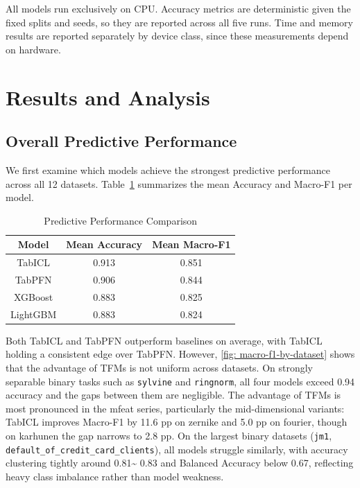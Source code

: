 \documentclass{SYSUReport}
\begin{document}
All models run exclusively on CPU. Accuracy metrics are deterministic given the fixed splits and seeds, so they are reported across all five runs. Time and memory results are reported separately by device class, since these measurements depend on hardware.








\section{Results and Analysis}
\subsection{Overall Predictive Performance}

We first examine which models achieve the strongest predictive performance across all 12 datasets. Table~\ref{tab: predictive_performance} summarizes the mean Accuracy and Macro-F1 per model.


\begin{table}[htbp]
    \centering
    \caption{Predictive Performance Comparison}
    \label{tab: predictive_performance}
    \begin{tabular}{ccc}
    \hline
        Model & Mean Accuracy & Mean Macro-F1 \\
    \hline
        TabICL & 0.913 & 0.851 \\
        TabPFN & 0.906 & 0.844 \\
        XGBoost & 0.883 & 0.825 \\
        LightGBM & 0.883 & 0.824 \\
    \hline
    \end{tabular}
\end{table}

Both TabICL and TabPFN outperform baselines on average, with TabICL holding a consistent edge over TabPFN. However, \autoref{fig: macro-f1-by-dataset} shows that the advantage of TFMs is not uniform across datasets. On strongly separable binary tasks such as \texttt{sylvine} and \texttt{ringnorm}, all four models exceed 0.94 accuracy and the gaps between them are negligible. The advantage of TFMs is most pronounced in the mfeat series, particularly the mid-dimensional variants: TabICL improves Macro-F1 by 11.6 pp on zernike and 5.0 pp on fourier, though on karhunen the gap narrows to 2.8 pp. On the largest binary datasets (\texttt{jm1}, \texttt{default\_of\_credit\_card\_clients}), all models struggle similarly, with accuracy clustering tightly around 0.81\textasciitilde{} 0.83 and Balanced Accuracy below 0.67, reflecting heavy class imbalance rather than model weakness.
\end{document}
